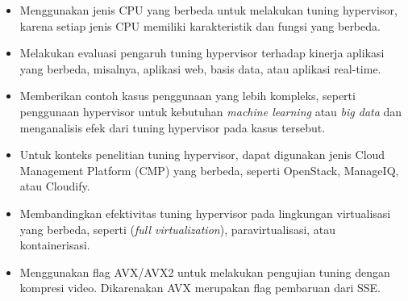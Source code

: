 \begin{itemize}
	\item Menggunakan jenis CPU yang berbeda untuk melakukan tuning hypervisor, karena setiap jenis CPU memiliki karakteristik dan fungsi yang berbeda.
	\item Melakukan evaluasi pengaruh tuning hypervisor terhadap kinerja aplikasi yang berbeda, misalnya, aplikasi web, basis data, atau aplikasi real-time.
	\item Memberikan contoh kasus penggunaan yang lebih kompleks, seperti penggunaan hypervisor untuk kebutuhan \textit{machine learning} atau \textit{big data} dan menganalisis efek dari tuning hypervisor pada kasus tersebut.
	\item Untuk konteks penelitian tuning hypervisor, dapat digunakan jenis Cloud Management Platform (CMP) yang berbeda, seperti OpenStack, ManageIQ, atau Cloudify.
	\item Membandingkan efektivitas tuning hypervisor pada lingkungan virtualisasi yang berbeda, seperti (\textit{full virtualization}), paravirtualisasi, atau kontainerisasi.
	\item Menggunakan flag AVX/AVX2 untuk melakukan pengujian tuning dengan kompresi video. Dikarenakan AVX merupakan flag pembaruan dari SSE.
\end{itemize}